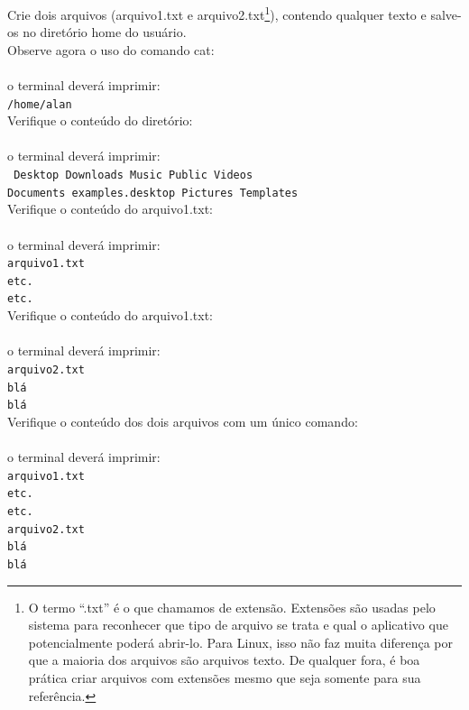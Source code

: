 \begin{refsection}

 Crie dois arquivos (arquivo1.txt e arquivo2.txt\footnote{O termo ``.txt'' é o que chamamos de extensão. Extensões são usadas pelo sistema para reconhecer que tipo de arquivo se trata e qual o aplicativo que potencialmente poderá abrir-lo. Para Linux, isso não faz muita diferença por que a maioria dos arquivos são arquivos texto. De qualquer fora, é boa prática criar arquivos com extensões mesmo que seja somente para sua referência.}), contendo qualquer texto e salve-os no diretório home do usuário.\\
 Observe agora o uso do comando cat:\\
\\
o terminal deverá imprimir:\\
\texttt{/home/alan}\\

Verifique o conteúdo do diretório:\\
\\

o terminal deverá imprimir:\\
\texttt{
Desktop    Downloads         Music     Public     Videos\\
Documents  examples.desktop  Pictures  Templates} \\

Verifique o conteúdo do arquivo1.txt:\\
\\
o terminal deverá imprimir:\\
\texttt{arquivo1.txt\\
etc.\\
etc.\\
}
Verifique o conteúdo do arquivo1.txt:\\
\\
o terminal deverá imprimir:\\
\texttt{arquivo2.txt\\
blá\\
blá\\
}
Verifique o conteúdo dos dois arquivos com um único comando:\\
\\
o terminal deverá imprimir:\\
\texttt{arquivo1.txt\\
etc.\\
etc.\\
arquivo2.txt\\
blá\\
blá\\
}


\end{refsection}
